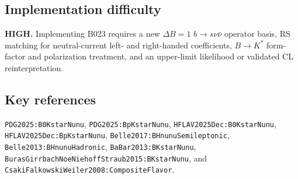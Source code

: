 \subsection*{Implementation difficulty}
\textbf{HIGH.}  Implementing B023 requires a new \(\Delta B=1\)
\(b\to s\nu\bar{\nu}\) operator basis, RS matching for neutral-current
left- and right-handed coefficients, \(B\to K^*\) form-factor and polarization
treatment, and an upper-limit likelihood or validated CL reinterpretation.

\subsection*{Key references}
\texttt{PDG2025:B0KstarNunu},
\texttt{PDG2025:BpKstarNunu},
\texttt{HFLAV2025Dec:B0KstarNunu},
\texttt{HFLAV2025Dec:BpKstarNunu},
\texttt{Belle2017:BHnunuSemileptonic},
\texttt{Belle2013:BHnunuHadronic},
\texttt{BaBar2013:BKstarNunu},
\texttt{BurasGirrbachNoeNiehoffStraub2015:BKstarNunu}, and
\texttt{CsakiFalkowskiWeiler2008:CompositeFlavor}.
